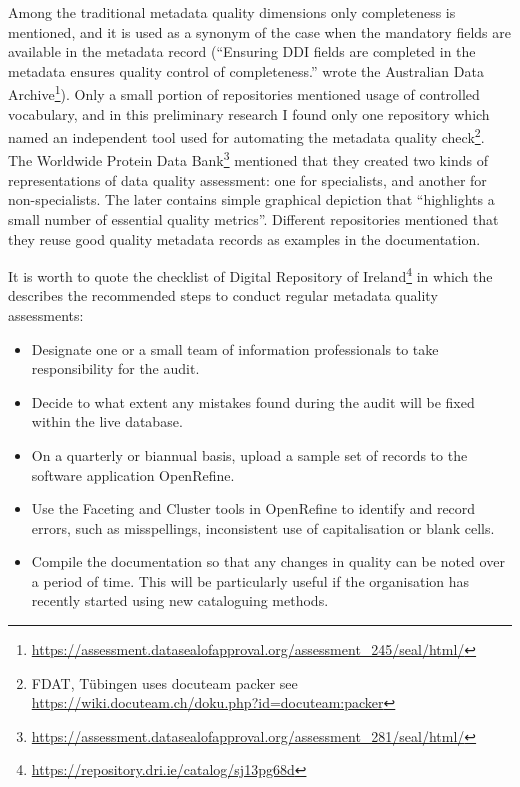 Among the traditional metadata quality dimensions only completeness is mentioned, and it is used as a synonym of the case when the mandatory fields are available in the metadata record (``Ensuring DDI fields are completed in the metadata ensures quality control of completeness.'' wrote the Australian Data Archive\footnote{\url{https://assessment.datasealofapproval.org/assessment_245/seal/html/}}). Only a small portion of repositories mentioned usage of controlled vocabulary, and in this preliminary research I found only one repository which named an independent tool used for automating the metadata quality check\footnote{FDAT, Tübingen uses docuteam packer see \url{https://wiki.docuteam.ch/doku.php?id=docuteam:packer}}. The Worldwide Protein Data Bank\footnote{\url{https://assessment.datasealofapproval.org/assessment_281/seal/html/}} mentioned that they created two kinds of representations of data quality assessment: one for specialists, and another for non-specialists. The later contains simple graphical depiction that ``highlights a small number of essential quality metrics''. Different repositories mentioned that they reuse good quality metadata records as examples in the documentation.

It is worth to quote the checklist of Digital Repository of Ireland\footnote{\url{https://repository.dri.ie/catalog/sj13pg68d}} in which the describes the recommended steps to conduct regular metadata quality assessments:

\begin{itemize}
  \setlength{\parskip}{0pt}
  \setlength{\itemsep}{0pt plus 1pt}
  \item Designate one or a small team of information professionals to take responsibility for the audit.
  \item Decide to what extent any mistakes found during the audit will be fixed within the live database.
  \item On a quarterly or biannual basis, upload a sample set of records to the software application OpenRefine.
  \item Use the Faceting and Cluster tools in OpenRefine to identify and record errors, such as misspellings, inconsistent use of capitalisation or blank cells.
  \item Compile the documentation so that any changes in quality can be noted over a period of time. This will be particularly useful if the organisation has recently started using new cataloguing methods.
\end{itemize}

